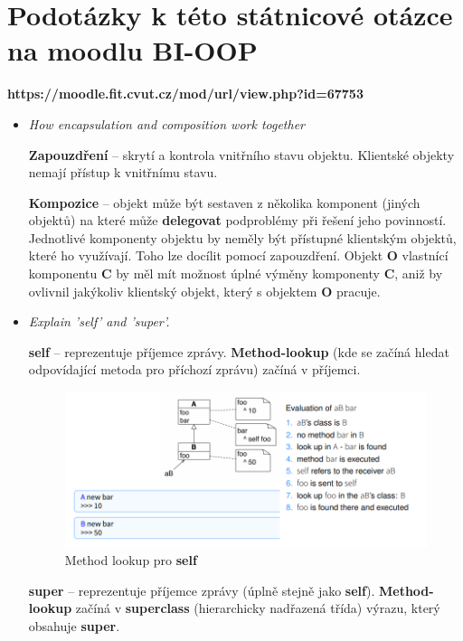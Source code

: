 \documentclass{szzclass}
\begin{document}
\section{Podotázky k této státnicové otázce na moodlu BI-OOP}

\textbf{https://moodle.fit.cvut.cz/mod/url/view.php?id=67753}

\begin{itemize}
      \item \textit{How encapsulation and composition work together}
      
      \textbf{Zapouzdření} -- skrytí a kontrola vnitřního stavu objektu. Klientské objekty nemají přístup
      k vnitřnímu stavu.

      \textbf{Kompozice} -- objekt může být sestaven z několika komponent (jiných objektů) na které může
      \textbf{delegovat} podproblémy při řešení jeho povinností. Jednotlivé komponenty objektu by neměly být
      přístupné klientským objektů, které ho využívají. Toho lze docílit pomocí zapouzdření.
      Objekt \textbf{O} vlastnící komponentu \textbf{C} by měl mít možnost úplné výměny komponenty \textbf{C},
      aniž by ovlivnil jakýkoliv klientský objekt, který s objektem \textbf{O} pracuje.
      
      \item \textit{Explain 'self' and 'super'.}
      
      \textbf{self} -- reprezentuje příjemce zprávy. \textbf{Method-lookup} (kde se začíná hledat odpovídající
      metoda pro příchozí zprávu) začíná v příjemci.

      \begin{figure}[h]
            \centering
            \includegraphics[width=1\textwidth]{topics/bi-wsi-si-09/self.png}
            \caption{Method lookup pro \textbf{self}}
      \end{figure}

      \textbf{super} -- reprezentuje příjemce zprávy (úplně stejně jako \textbf{self}). \textbf{Method-lookup}
      začíná v \textbf{superclass} (hierarchicky nadřazená třída) výrazu, který obsahuje \textbf{super}.


\end{itemize}
\end{document}
